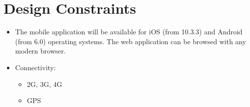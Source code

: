 \section{Design Constraints}
\begin{itemize}

\item The mobile application will be available for iOS (from 10.3.3) and Android (from 6.0) operating systems.
The web application can be browsed with any modern browser. 
\item 
Connectivity:
\begin{itemize}
\item 2G, 3G, 4G
\item GPS
\end{itemize}

\end{itemize}
